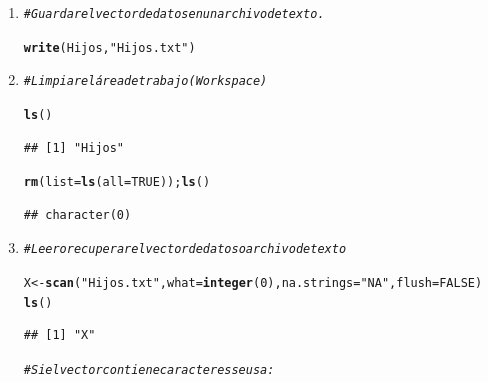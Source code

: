 \documentclass[12pt,letterpaper]{article}\usepackage[]{graphicx}\usepackage[]{color}
\makeatletter
\newcommand{\hlnum}[1]{\textcolor[rgb]{0.686,0.059,0.569}{#1}}%
\newcommand{\hlstr}[1]{\textcolor[rgb]{0.192,0.494,0.8}{#1}}%
\newcommand{\hlcom}[1]{\textcolor[rgb]{0.678,0.584,0.686}{\textit{#1}}}%
\newcommand{\hlstd}[1]{\textcolor[rgb]{0.345,0.345,0.345}{#1}}%
\newcommand{\hlkwb}[1]{\textcolor[rgb]{0.69,0.353,0.396}{#1}}%
\newcommand{\hlkwc}[1]{\textcolor[rgb]{0.333,0.667,0.333}{#1}}%
\newcommand{\hlkwd}[1]{\textcolor[rgb]{0.737,0.353,0.396}{\textbf{#1}}}%
\newenvironment{kframe}{%
 \def\at@end@of@kframe{}%
 \ifinner\ifhmode%
  \def\at@end@of@kframe{\end{minipage}}%
  \begin{minipage}{\columnwidth}%
 \fi\fi%
 \def\FrameCommand##1{\hskip\@totalleftmargin \hskip-\fboxsep
 \colorbox{shadecolor}{##1}\hskip-\fboxsep
     \hskip-\linewidth \hskip-\@totalleftmargin \hskip\columnwidth}%
 \MakeFramed {\advance\hsize-\width
   \@totalleftmargin\z@ \linewidth\hsize
   \@setminipage}}%
 {\par\unskip\endMakeFramed%
 \at@end@of@kframe}
\newenvironment{knitrout}{}{} %
\makeatother
\begin{document}
\begin{enumerate}
\item
\begin{knitrout}
\color{fgcolor}\begin{kframe}
\begin{alltt}
\hlcom{# Guardar el vector de datos en un archivo de texto. }

\hlkwd{write}\hlstd{(Hijos,} \hlstr{"Hijos.txt"}\hlstd{)}
\end{alltt}
\end{kframe}
\end{knitrout}

\item
\begin{knitrout}
\color{fgcolor}\begin{kframe}
\begin{alltt}
\hlcom{# Limpiar el área de trabajo (Workspace)}

\hlkwd{ls}\hlstd{()}
\end{alltt}
\begin{verbatim}
## [1] "Hijos"
\end{verbatim}
\begin{alltt}
\hlkwd{rm}\hlstd{(}\hlkwc{list}\hlstd{=}\hlkwd{ls}\hlstd{(}\hlkwc{all}\hlstd{=}\hlnum{TRUE}\hlstd{));} \hlkwd{ls}\hlstd{()}
\end{alltt}
\begin{verbatim}
## character(0)
\end{verbatim}
\end{kframe}
\end{knitrout}

\item
\begin{knitrout}
\color{fgcolor}\begin{kframe}
\begin{alltt}
\hlcom{# Leer o recuperar el vector de datos o archivo de texto }

\hlstd{X} \hlkwb{<-} \hlkwd{scan}\hlstd{(}\hlstr{"Hijos.txt"}\hlstd{,} \hlkwc{what} \hlstd{=} \hlkwd{integer}\hlstd{(}\hlnum{0}\hlstd{),} \hlkwc{na.strings} \hlstd{=} \hlstr{"NA"}\hlstd{,} \hlkwc{flush}\hlstd{=}\hlnum{FALSE}\hlstd{)}
\hlkwd{ls}\hlstd{()}
\end{alltt}
\begin{verbatim}
## [1] "X"
\end{verbatim}
\end{kframe}
\end{knitrout}
\begin{knitrout}
\color{fgcolor}\begin{kframe}
\begin{alltt}
\hlcom{# Si el vector contiene caracteres se usa: }


\end{alltt}
\end{kframe}
\end{knitrout}
\end{enumerate}
\end{document}
